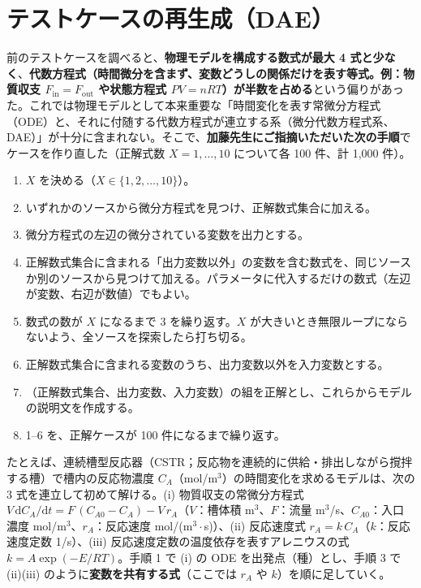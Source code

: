 \documentclass[11pt,a4paper]{ltjsarticle}
\begin{document}
\section{テストケースの再生成（DAE）}\label{sec:dae}
前のテストケースを調べると、\textbf{物理モデルを構成する数式が最大 4 式と少なく}、\textbf{代数方程式（時間微分を含まず、変数どうしの関係だけを表す等式。例：物質収支 $F_{\mathrm{in}}=F_{\mathrm{out}}$ や状態方程式 $PV=nRT$）が半数を占める}という偏りがあった。これでは物理モデルとして本来重要な「時間変化を表す常微分方程式（ODE）と、それに付随する代数方程式が連立する系（微分代数方程式系、DAE）」が十分に含まれない。そこで、\textbf{加藤先生にご指摘いただいた次の手順}でケースを作り直した（正解式数 $X=1,\dots,10$ について各 100 件、計 1{,}000 件）。

\begin{tcolorbox}[colback=gray!5, colframe=gray!50, boxrule=0.4pt, left=2mm, right=2mm, top=1mm, bottom=1mm]
\small
\begin{enumerate}[leftmargin=1.6em, nosep]
  \item[0.] $X$ を決める（$X\in\{1,2,\dots,10\}$）。
  \item いずれかのソースから微分方程式を見つけ、正解数式集合に加える。
  \item 微分方程式の左辺の微分されている変数を出力とする。
  \item 正解数式集合に含まれる「出力変数以外」の変数を含む数式を、同じソースか別のソースから見つけて加える。パラメータに代入するだけの数式（左辺が変数、右辺が数値）でもよい。
  \item 数式の数が $X$ になるまで 3 を繰り返す。$X$ が大きいとき無限ループにならないよう、全ソースを探索したら打ち切る。
  \item 正解数式集合に含まれる変数のうち、出力変数以外を入力変数とする。
  \item （正解数式集合、出力変数、入力変数）の組を正解とし、これらからモデルの説明文を作成する。
  \item 1--6 を、正解ケースが 100 件になるまで繰り返す。
\end{enumerate}
\end{tcolorbox}

たとえば、連続槽型反応器（CSTR；反応物を連続的に供給・排出しながら撹拌する槽）で槽内の反応物濃度 $C_A$（mol/m$^3$）の時間変化を求めるモデルは、次の 3 式を連立して初めて解ける。(i) 物質収支の常微分方程式 $V\,\mathrm{d}C_A/\mathrm{d}t = F\,(C_{A0}-C_A) - V\,r_A$（$V$：槽体積 m$^3$、$F$：流量 m$^3$/s、$C_{A0}$：入口濃度 mol/m$^3$、$r_A$：反応速度 mol/(m$^3\cdot$s)）、(ii) 反応速度式 $r_A = k\,C_A$（$k$：反応速度定数 1/s）、(iii) 反応速度定数の温度依存を表すアレニウスの式 $k = A\exp(-E/RT)$。手順 1 で (i) の ODE を出発点（種）とし、手順 3 で (ii)(iii) のように\textbf{変数を共有する式}（ここでは $r_A$ や $k$）を順に足していく。
\end{document}
